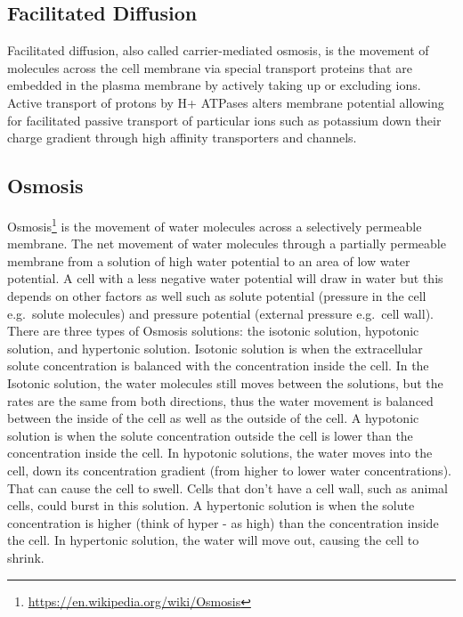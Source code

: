 \documentclass[
]{book}
\renewcommand{\href}[2]{#2\footnote{\url{#1}}}
\begin{document}
\hypertarget{facilitated-diffusion}{%
\subsection{Facilitated Diffusion}\label{facilitated-diffusion}}

Facilitated diffusion, also called carrier-mediated osmosis, is the movement of molecules across the cell membrane via special transport proteins that are embedded in the plasma membrane by actively taking up or excluding ions. Active transport of protons by H+ ATPases alters membrane potential allowing for facilitated passive transport of particular ions such as potassium down their charge gradient through high affinity transporters and channels.

\hypertarget{osmosis}{%
\subsection{Osmosis}\label{osmosis}}

\href{https://en.wikipedia.org/wiki/Osmosis}{Osmosis} is the movement of water molecules across a selectively permeable membrane. The net movement of water molecules through a partially permeable membrane from a solution of high water potential to an area of low water potential. A cell with a less negative water potential will draw in water but this depends on other factors as well such as solute potential (pressure in the cell e.g.~solute molecules) and pressure potential (external pressure e.g.~cell wall). There are three types of Osmosis solutions: the isotonic solution, hypotonic solution, and hypertonic solution. Isotonic solution is when the extracellular solute concentration is balanced with the concentration inside the cell. In the Isotonic solution, the water molecules still moves between the solutions, but the rates are the same from both directions, thus the water movement is balanced between the inside of the cell as well as the outside of the cell. A hypotonic solution is when the solute concentration outside the cell is lower than the concentration inside the cell. In hypotonic solutions, the water moves into the cell, down its concentration gradient (from higher to lower water concentrations). That can cause the cell to swell. Cells that don't have a cell wall, such as animal cells, could burst in this solution. A hypertonic solution is when the solute concentration is higher (think of hyper - as high) than the concentration inside the cell. In hypertonic solution, the water will move out, causing the cell to shrink.
\end{document}

